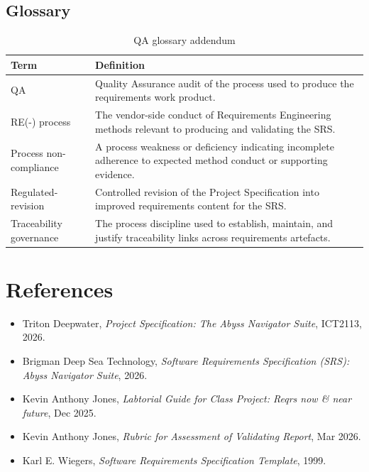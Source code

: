 \documentclass[11pt,a4paper]{article}
\begin{document}
\subsection{Glossary}

\begin{table}[H]
\centering
\small
\renewcommand{\arraystretch}{1.4}
\begin{tabularx}{\textwidth}{|p{}|X|}
\hline
\rowcolor{tableheader}
\textbf{Term} & \textbf{Definition} \\
\hline
QA & Quality Assurance audit of the process used to produce the requirements work product. \\
\hline
RE(-) process & The vendor-side conduct of Requirements Engineering methods relevant to producing and validating the SRS. \\
\hline
Process non-compliance & A process weakness or deficiency indicating incomplete adherence to expected method conduct or supporting evidence. \\
\hline
Regulated-revision & Controlled revision of the Project Specification into improved requirements content for the SRS. \\
\hline
Traceability governance & The process discipline used to establish, maintain, and justify traceability links across requirements artefacts. \\
\hline
\end{tabularx}
\caption{QA glossary addendum}
\label{tab:qa-glossary}
\end{table}

\clearpage
{}
\setcounter{page}{1}
\renewcommand{\thepage}{R-\arabic{page}}
\section*{References}
\begin{itemize}[leftmargin=*,nosep]
\item Triton Deepwater, \textit{Project Specification: The Abyss Navigator Suite}, ICT2113, 2026.
\item Brigman Deep Sea Technology, \textit{Software Requirements Specification (SRS): Abyss Navigator Suite}, 2026.
\item Kevin Anthony Jones, \textit{Labtorial Guide for Class Project: Reqrs now \& near future}, Dec 2025.
\item Kevin Anthony Jones, \textit{Rubric for Assessment of Validating Report}, Mar 2026.
\item Karl E. Wiegers, \textit{Software Requirements Specification Template}, 1999.
\end{itemize}
\end{document}
